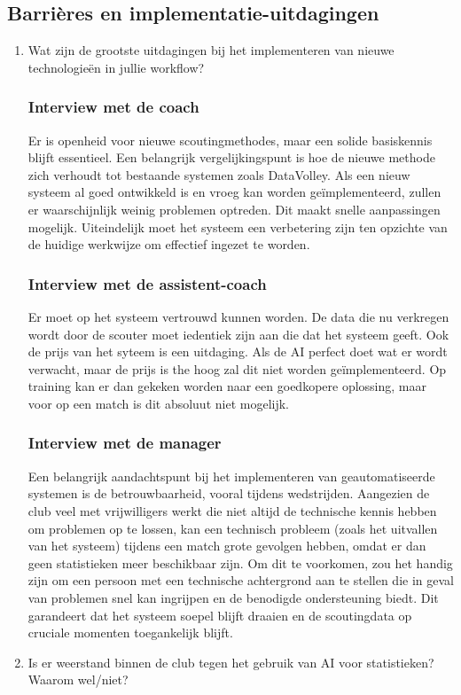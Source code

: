 \subsection{Barrières en implementatie-uitdagingen}
\begin{enumerate}
  \item Wat zijn de grootste uitdagingen bij het implementeren van nieuwe technologieën in jullie workflow?
  \subsubsection{Interview met de coach}
  Er is openheid voor nieuwe scoutingmethodes, maar een solide basiskennis blijft essentieel. Een belangrijk vergelijkingspunt is hoe de nieuwe methode zich verhoudt tot bestaande systemen zoals DataVolley. Als een nieuw systeem al goed ontwikkeld is en vroeg kan worden geïmplementeerd, zullen er waarschijnlijk weinig problemen optreden. Dit maakt snelle aanpassingen mogelijk. Uiteindelijk moet het systeem een verbetering zijn ten opzichte van de huidige werkwijze om effectief ingezet te worden.
  \subsubsection{Interview met de assistent-coach}
  Er moet op het systeem vertrouwd kunnen worden. De data die nu verkregen wordt door de scouter moet iedentiek zijn aan die dat het systeem geeft. Ook de prijs van het syteem is een uitdaging. Als de AI perfect doet wat er wordt verwacht, maar de prijs is the hoog zal dit niet worden geïmplementeerd. Op training kan er dan gekeken worden naar een goedkopere oplossing, maar voor op een match is dit absoluut niet mogelijk.
  \subsubsection{Interview met de manager}
  Een belangrijk aandachtspunt bij het implementeren van geautomatiseerde systemen is de betrouwbaarheid, vooral tijdens wedstrijden. Aangezien de club veel met vrijwilligers werkt die niet altijd de technische kennis hebben om problemen op te lossen, kan een technisch probleem (zoals het uitvallen van het systeem) tijdens een match grote gevolgen hebben, omdat er dan geen statistieken meer beschikbaar zijn. Om dit te voorkomen, zou het handig zijn om een persoon met een technische achtergrond aan te stellen die in geval van problemen snel kan ingrijpen en de benodigde ondersteuning biedt. Dit garandeert dat het systeem soepel blijft draaien en de scoutingdata op cruciale momenten toegankelijk blijft.
  \item Is er weerstand binnen de club tegen het gebruik van AI voor statistieken? Waarom wel/niet?

\end{enumerate}
